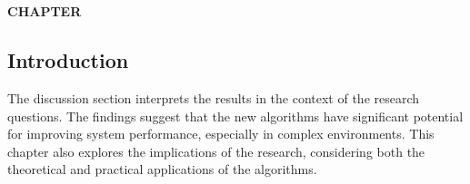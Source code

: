 \chapter*{}  %

\setcounter{chapter}{5}  %
\setcounter{section}{0}  %
\setcounter{subsection}{0}  %
\setcounter{subsubsection}{0}  %

\vspace*{-50mm}


\vspace*{10mm}  %

\begin{center}
    \textbf{CHAPTER \thechapter}\\
    \vspace{5mm}  %
    \textbf{\chapterFIVEtopic}
\end{center}

\vspace{10mm}  %

\section{Introduction}

\setlength{\parindent}{1cm}  %

\begin{spacing}{2}  %

The discussion section interprets the results in the context of the research questions. The findings suggest that the new algorithms have significant potential for improving system performance, especially in complex environments. This chapter also explores the implications of the research, considering both the theoretical and practical applications of the algorithms.

\end{spacing}
